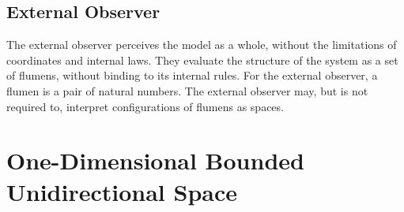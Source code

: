 \documentclass[final]{article}
\begin{document}
        \subsection{External Observer}

            The external observer perceives the model as a whole, without the 
            limitations of coordinates and internal laws. They evaluate the 
            structure of the system as a set of flumens, without binding to its 
            internal rules. For the external observer, a flumen is a pair of 
            natural numbers. The external observer may, but is not required to, 
            interpret configurations of flumens as spaces.



    \section{One-Dimensional Bounded Unidirectional Space}
\end{document}
